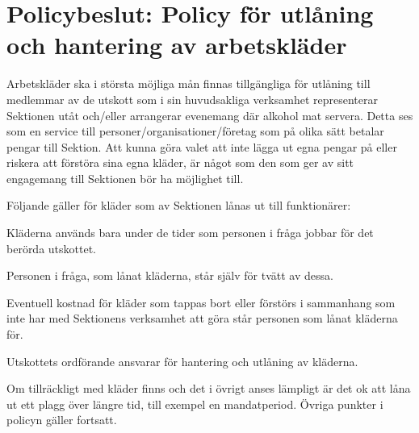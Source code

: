 \documentclass[../_main/handlingar.tex]{subfiles}
\begin{document}
\newpage
\section*{Policybeslut: Policy för utlåning och hantering av arbetskläder}
Arbetskläder ska i största möjliga mån finnas tillgängliga för utlåning till medlemmar av de utskott som i sin huvudsakliga verksamhet representerar Sektionen utåt och/eller arrangerar evenemang där alkohol mat servera. Detta ses som en service till personer/organisationer/företag som på olika sätt betalar pengar till Sektion. Att kunna göra valet att inte lägga ut egna pengar på eller riskera att förstöra sina egna kläder, är något som den som ger av sitt engagemang till Sektionen bör ha möjlighet till.

\begin{dashlist}
    \item Följande gäller för kläder som av Sektionen lånas ut till funktionärer:
    \item Kläderna används bara under de tider som personen i fråga jobbar för det berörda utskottet.
    \item Personen i fråga, som lånat kläderna, står själv för tvätt av dessa.
    \item Eventuell kostnad för kläder som tappas bort eller förstörs i sammanhang som inte har med Sektionens verksamhet att göra står personen som lånat kläderna för.
    \item Utskottets ordförande ansvarar för hantering och utlåning av kläderna.
    \item Om tillräckligt med kläder finns och det i övrigt anses lämpligt är det ok att låna ut ett plagg över längre tid, till exempel en mandatperiod. Övriga punkter i policyn gäller fortsatt.
\end{dashlist}
\end{document}
